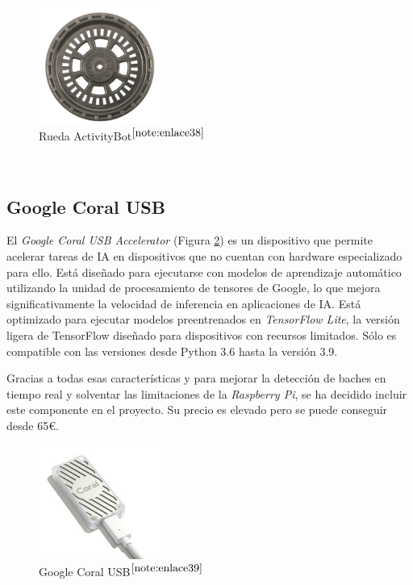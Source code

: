 \begin{figure} [h!]
	\begin{center}
		\includegraphics[width=4cm]{figs/wheel.png}
	\end{center}
	\caption{Rueda ActivityBot$^{\ref{note:enlace38}}$} 
\label{fig:wheel}
\end{figure}\

\setcounter{footnote}{38} %

\subsection{Google Coral USB}

El \textit{Google Coral USB Accelerator} (Figura \ref{fig:googlecoral}) es un dispositivo que permite acelerar tareas de \ac{IA} en dispositivos que no cuentan con hardware especializado para ello. Está diseñado para ejecutarse con modelos de aprendizaje automático utilizando la unidad de procesamiento de tensores de Google, lo que mejora significativamente la velocidad de inferencia en aplicaciones de \acs{IA}. Está optimizado para ejecutar modelos preentrenados en \textit{TensorFlow Lite}, la versión ligera de TensorFlow diseñado para dispositivos con recursos limitados. Sólo es compatible con  las versiones desde Python 3.6 hasta la versión 3.9.

Gracias a todas esas características y para mejorar la detección de baches en tiempo real y solventar las limitaciones de la \textit{Raspberry Pi}, se ha decidido incluir este componente en el proyecto. Su precio es elevado pero se puede conseguir desde 65€.
 
\begin{figure} [h!]
	\begin{center}
		\includegraphics[width=4cm]{figs/googlecoral.png}
	\end{center}
	\caption{Google Coral USB$^{\ref{note:enlace39}}$} 
	\label{fig:googlecoral}
\end{figure}\

